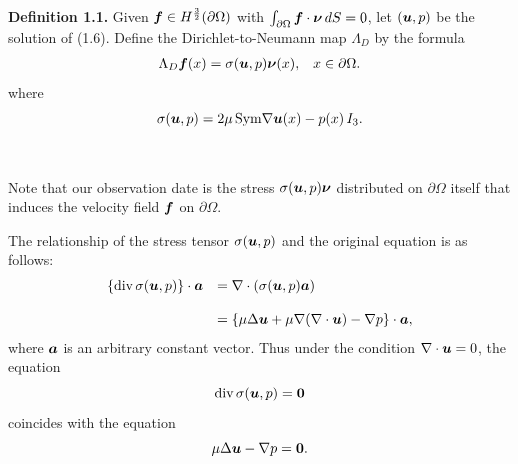 {\bf\noindent Definition 1.1.}  Given $\mbox{\boldmath $f$}\in H^{\frac{3}{2}}(\partial\Omega)$ with
$\int_{\partial\Omega}\mbox{\boldmath $f$}\cdot\mbox{\boldmath $\nu$}\,dS=0$, let
$(\mbox{\boldmath $u$},p)$ be the solution of (1.6).
Define the Dirichlet-to-Neumann map $\Lambda_D$ by the formula
$$\begin{array}{ll}
\displaystyle
\Lambda_D\mbox{\boldmath $f$}(x)=
\sigma(\mbox{\boldmath $u$},p)\mbox{\boldmath $\nu$}(x), & x\in\partial\Omega.
\end{array}
$$
where
$$\displaystyle
\sigma(\mbox{\boldmath $u$},p)
=2\mu\,\text{Sym}\nabla\mbox{\boldmath $u$}(x)-p(x)\,I_3.
$$



$\quad$


\noindent
Note that our observation date is the stress $\sigma(\mbox{\boldmath $u$},p)\mbox{\boldmath $\nu$}$ 
distributed on $\partial\Omega$ itself that induces the velocity field $\mbox{\boldmath $f$}$ on $\partial\Omega$.



The relationship of the stress tensor $\sigma(\mbox{\boldmath $u$},p)$ and the original equation is as follows:
$$\begin{array}{ll}
\displaystyle
\{\text{div}\,\sigma(\mbox{\boldmath $u$},p)\}\cdot\mbox{\boldmath $a$}
&
\displaystyle
=
\nabla\cdot(\sigma(\mbox{\boldmath $u$},p)\mbox{\boldmath $a$})\\
\\
\displaystyle
&
\displaystyle
=\{\mu\Delta\mbox{\boldmath $u$}+\mu\nabla(\nabla\cdot\mbox{\boldmath $u$})-\nabla p\}\cdot\mbox{\boldmath $a$},
\end{array}
$$
where $\mbox{\boldmath $a$}$ is an arbitrary constant vector.
Thus under the condition $\nabla\cdot\mbox{\boldmath $u$}=0$, the equation
$$\displaystyle
\text{div}\,\sigma(\mbox{\boldmath $u$},p)=\mbox{\boldmath $0$}
$$
coincides with the equation 
$$\displaystyle
\mu\Delta\mbox{\boldmath $u$}-\nabla p=\mbox{\boldmath $0$}.
$$



















